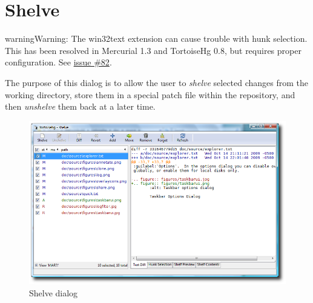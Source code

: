 \documentclass[letterpaper,10pt,english]{manual}
\begin{document}
\resetcurrentobjects
\hypertarget{--doc-shelve}{}

\section{Shelve}
\hypertarget{module-shelve.dialog}{}
\begin{notice}{warning}{Warning:}
The win32text extension can cause trouble with hunk selection.  This
has been resolved in Mercurial 1.3 and TortoiseHg 0.8, but requires
proper configuration. See
\href{http://bitbucket.org/tortoisehg/stable/issue/82/}{issue \#82}.
\end{notice}

The purpose of this dialog is to allow the user to \emph{shelve} selected changes
from the working directory, store them in a special patch file within the
repository, and then \emph{unshelve} them back at a later time.
\begin{figure}[htbp]
\centering

\includegraphics{shelve.png}
\caption{Shelve dialog}\end{figure}
\end{document}
